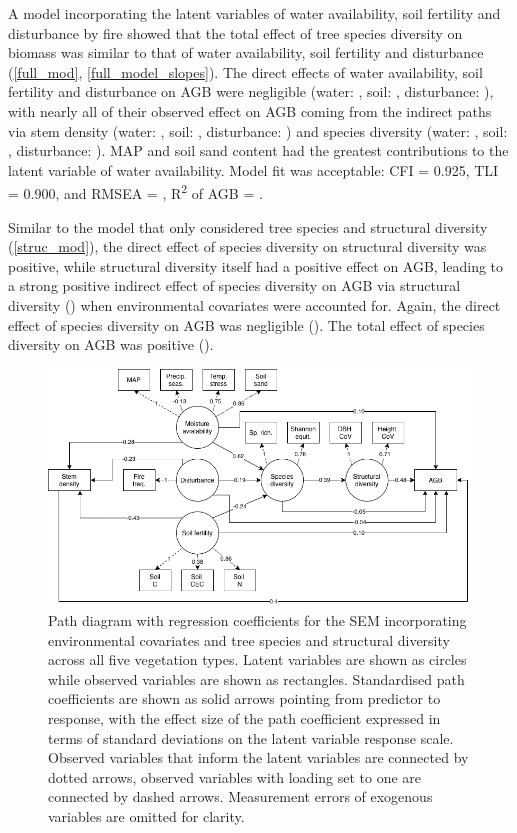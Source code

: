 \documentclass[11pt,a4paper]{article}
\begin{document}
A model incorporating the latent variables of water availability, soil fertility and disturbance by fire showed that the total effect of tree species diversity on biomass was similar to that of water availability, soil fertility and disturbance (\autoref{full_mod}, \autoref{full_model_slopes}). The direct effects of water availability, soil fertility and disturbance on AGB were negligible (water: \fmbetamb{}, soil: \fmbetasb{}, disturbance: \fmbetafb{}), with nearly all of their observed effect on AGB coming from the indirect paths via stem density (water: \fmbetamib{}, soil: \fmbetasib{}, disturbance: \fmbetafib{}) and species diversity (water: \fmbetamd{}, soil: \fmbetasd{}, disturbance: \fmbetafd{}). MAP and soil sand content had the greatest contributions to the latent variable of water availability. Model fit was acceptable: CFI = 0.925, TLI = 0.900, and RMSEA = \fmrmsea{}, R\textsuperscript{2} of AGB = \fmrsq{}. 

Similar to the model that only considered tree species and structural diversity (\autoref{struc_mod}), the direct effect of species diversity on structural diversity was positive, while structural diversity itself had a positive effect on AGB, leading to a strong positive indirect effect of species diversity on AGB via structural diversity (\fmbetadhb{}) when environmental covariates were accounted for. Again, the direct effect of species diversity on AGB was negligible (\fmbetadb{}). The total effect of species diversity on AGB was positive (\fmbetatotaldb{}).

\begin{figure}[H]
\centering
	\includegraphics[width=\textwidth]{full}
	\caption{Path diagram with regression coefficients for the SEM incorporating environmental covariates and tree species and structural diversity across all five vegetation types. Latent variables are shown as circles while observed variables are shown as rectangles. Standardised path coefficients are shown as solid arrows pointing from predictor to response, with the effect size of the path coefficient expressed in terms of standard deviations on the latent variable response scale. Observed variables that inform the latent variables are connected by dotted arrows, observed variables with loading set to one are connected by dashed arrows. Measurement errors of exogenous variables are omitted for clarity.}
	\label{full_mod}
\end{figure}
\end{document}
